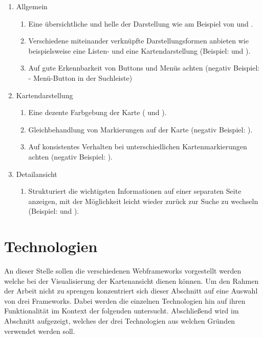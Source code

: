 \documentclass[../Bachelorarbeit.tex]{subfiles}
\begin{document}
\begin{enumerate}
	\item Allgemein
	\begin{enumerate}
		\item[] Eine übersichtliche und helle der Darstellung wie am Beispiel von  und .
		\item[] Verschiedene miteinander verknüpfte Darstellungsformen anbieten wie beispielsweise eine Listen- und eine Kartendarstellung (Beispiel:  und ).
		\item[] Auf gute Erkennbarkeit von Buttons und Menüs achten (negativ Beispiel:  - Menü-Button in der Suchleiste)
	\end{enumerate}
	\item Kartendarstellung
	\begin{enumerate}
		\item[] Eine dezente Farbgebung der Karte ( und ).
		\item[] Gleichbehandlung von Markierungen auf der Karte (negativ Beispiel: ).
		\item[] Auf konsistentes Verhalten bei unterschiedlichen Kartenmarkierungen achten (negativ Beispiel: ).
	\end{enumerate}
	\item Detailansicht
	\begin{enumerate}
		\item[] Strukturiert die wichtigsten Informationen auf einer separaten Seite anzeigen, mit der Möglichkeit leicht wieder zurück zur Suche zu wechseln (Beispiel:  und ).
	\end{enumerate}
\end{enumerate}

\section{Technologien}
An dieser Stelle sollen die verschiedenen Webframeworks vorgestellt werden welche bei der Visualisierung der Kartenansicht dienen können.
Um den Rahmen der Arbeit nicht zu sprengen konzentriert sich dieser Abschnitt auf eine Auswahl von drei Frameworks.
Dabei werden die einzelnen Technologien hin auf ihren Funktionalität im Kontext der folgenden  untersucht. 
Abschließend wird im Abschnitt  aufgezeigt, welches der drei Technologien aus welchen Gründen verwendet werden soll.
\end{document}
